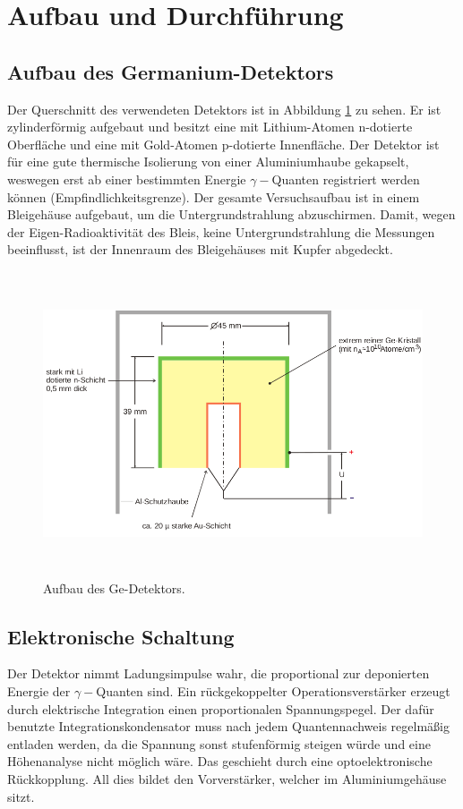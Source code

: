 \newpage
\section{Aufbau und Durchführung}
\label{sec:Durchfuehrung}
\subsection{Aufbau des Germanium-Detektors}
Der Querschnitt des verwendeten Detektors ist in Abbildung \ref{fig:Detektor} zu sehen.
Er ist zylinderförmig aufgebaut und besitzt eine mit Lithium-Atomen n-dotierte Oberfläche und eine mit Gold-Atomen p-dotierte Innenfläche.
Der Detektor ist für eine gute thermische Isolierung von einer Aluminiumhaube gekapselt, weswegen erst ab einer bestimmten Energie $\gamma-$Quanten registriert werden können (Empfindlichkeitsgrenze).
Der gesamte Versuchsaufbau ist in einem Bleigehäuse aufgebaut, um die Untergrundstrahlung abzuschirmen.
Damit, wegen der Eigen-Radioaktivität des Bleis, keine Untergrundstrahlung die Messungen beeinflusst, ist der Innenraum des Bleigehäuses mit Kupfer abgedeckt.
 \begin{figure}
   \centering
   \includegraphics[height=9cm]{content/pictures/Detektor.png}
   \caption{Aufbau des Ge-Detektors.\cite{V18}}
   \label{fig:Detektor}
 \end{figure}
\subsection{Elektronische Schaltung}
Der Detektor nimmt Ladungsimpulse wahr, die proportional zur deponierten Energie der $\gamma-$Quanten sind.
Ein rückgekoppelter Operationsverstärker erzeugt durch elektrische Integration einen proportionalen Spannungspegel.
Der dafür benutzte Integrationskondensator muss nach jedem Quantennachweis regelmäßig entladen werden, da die Spannung sonst stufenförmig steigen würde und eine Höhenanalyse nicht möglich wäre.
Das geschieht durch eine optoelektronische Rückkopplung.
All dies bildet den Vorverstärker, welcher im Aluminiumgehäuse sitzt.

